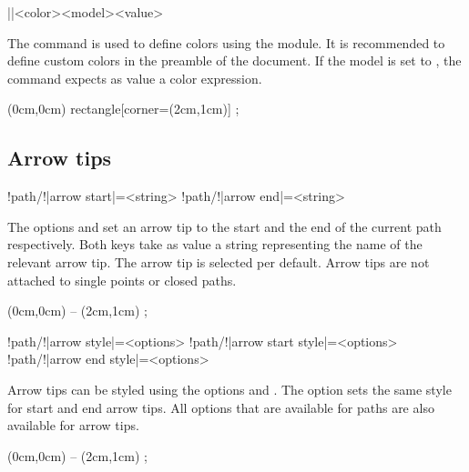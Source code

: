 \documentclass[a4paper]{article}
\begin{document}
{{\begin{macrodef}
|\qdrawsetcolor|{<color>}{<model>}{<value>}
\end{macrodef}
The command \macro{\qdrawsetcolor} is used to define colors using the  module. It is recommended to define custom colors in the preamble of the document. If the model is set to , the command expects as value a color expression.

\begin{codeexamplecolumns}
\begin{qdraw}[line width={5pt}]
  \path[
    stroke, stroke color={colorA},
    fill, fill color={colorB}
  ] (0cm,0cm) rectangle[corner={(2cm,1cm)}] ;
\end{qdraw}
\end{codeexamplecolumns}

\subsection{Arrow tips}

\begin{macrodef}
!path/!|arrow start|={<string>}
!path/!|arrow end|={<string>}
\end{macrodef}
The options  and  set an arrow tip to the start and the end of the current path respectively. Both keys take as value a string representing the name of the relevant arrow tip. The  arrow tip is selected per default. Arrow tips are not attached to single points or closed paths.

\begin{codeexamplecolumns}
\begin{qdraw}
    (0cm,0cm) -- (2cm,1cm) ;
\end{qdraw}
\end{codeexamplecolumns}

\begin{macrodef}
!path/!|arrow style|={<options>}
!path/!|arrow start style|={<options>}
!path/!|arrow end style|={<options>}
\end{macrodef}
Arrow tips can be styled using the options  and . The option  sets the same style for start and end arrow tips. All options that are available for paths are also available for arrow tips.

\begin{codeexamplecolumns}
\begin{qdraw}
  \stroke[
    arrow end, 
    arrow style={fill, fill color=blue}
  ]
    (0cm,0cm) -- (2cm,1cm) ;
\end{qdraw}
\end{codeexamplecolumns}

}}
\end{document}
